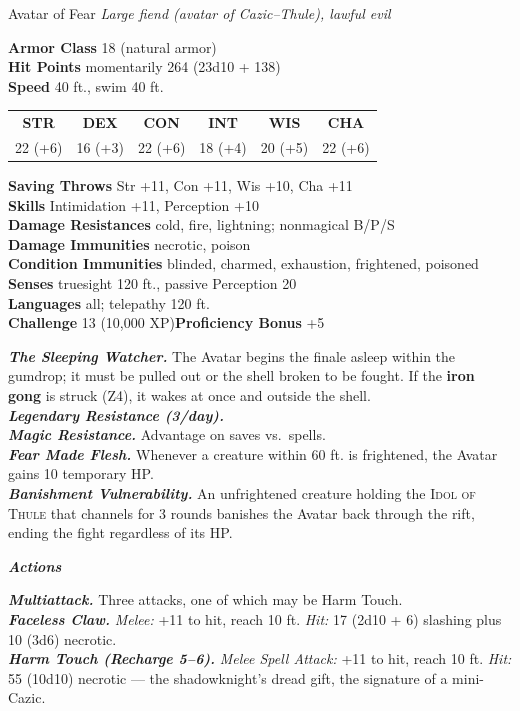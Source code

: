 \documentclass[10pt,twoside]{article}
\newcommand{\abilities}[6]{%
\begin{center}\small
\setlength{\tabcolsep}{6pt}\renewcommand{\arraystretch}{1.05}
\begin{tabular}{cccccc}
\textbf{STR}&\textbf{DEX}&\textbf{CON}&\textbf{INT}&\textbf{WIS}&\textbf{CHA}\\[1pt]
#1&#2&#3&#4&#5&#6\\
\end{tabular}\end{center}}
\newcommand{\sbrule}{\par\vspace{2pt}\noindent{\color{bloodred}\rule{\linewidth}{1.1pt}}\par\vspace{2pt}}
\newcommand{\eqname}[1]{\textsc{#1}}
\begin{document}
\begin{statblock}{Avatar of Fear}
\textit{Large fiend (avatar of Cazic--Thule), lawful evil}\sbrule
\textbf{Armor Class} 18 (natural armor)\\
\textbf{Hit Points} momentarily 264 (23d10 + 138)\\
\textbf{Speed} 40 ft., swim 40 ft.\sbrule
\abilities{22 (+6)}{16 (+3)}{22 (+6)}{18 (+4)}{20 (+5)}{22 (+6)}
\sbrule
\textbf{Saving Throws} Str +11, Con +11, Wis +10, Cha +11\\
\textbf{Skills} Intimidation +11, Perception +10\\
\textbf{Damage Resistances} cold, fire, lightning; nonmagical B/P/S\\
\textbf{Damage Immunities} necrotic, poison\\
\textbf{Condition Immunities} blinded, charmed, exhaustion, frightened, poisoned\\
\textbf{Senses} truesight 120 ft., passive Perception 20\\
\textbf{Languages} all; telepathy 120 ft.\\
\textbf{Challenge} 13 (10,000 XP)\hfill\textbf{Proficiency Bonus} +5\sbrule
\textbf{\textit{The Sleeping Watcher.}} The Avatar begins the finale asleep within the
gumdrop; it must be pulled out or the shell broken to be fought. If the \textbf{iron
gong} is struck (Z4), it wakes at once and outside the shell.\\
\textbf{\textit{Legendary Resistance (3/day).}}\\
\textbf{\textit{Magic Resistance.}} Advantage on saves vs.\ spells.\\
\textbf{\textit{Fear Made Flesh.}} Whenever a creature within 60 ft. is frightened, the
Avatar gains 10 temporary HP.\\
\textbf{\textit{Banishment Vulnerability.}} An unfrightened creature holding the
\eqname{Idol of Thule} that channels for 3 rounds banishes the Avatar back through the
rift, ending the fight regardless of its HP.\sbrule
\textit{\textbf{Actions}}\par
\textbf{\textit{Multiattack.}} Three attacks, one of which may be Harm Touch.\\
\textbf{\textit{Faceless Claw.}} \textit{Melee:} +11 to hit, reach 10 ft.
\textit{Hit:} 17 (2d10 + 6) slashing plus 10 (3d6) necrotic.\\
\textbf{\textit{Harm Touch (Recharge 5--6).}} \textit{Melee Spell Attack:} +11 to hit,
reach 10 ft. \textit{Hit:} 55 (10d10) necrotic --- the shadowknight's dread gift, the
signature of a mini-Cazic.\\

\end{statblock}
\end{document}
